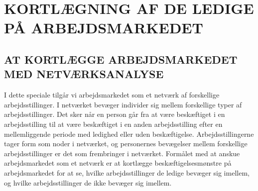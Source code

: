 



\chapter{KORTLÆGNING AF DE LEDIGE PÅ ARBEJDSMARKEDET} \label{metode}













\section{AT KORTLÆGGE ARBEJDSMARKEDET MED NETVÆRKSANALYSE \label{netvaerksanalyse}}

I dette speciale tilgår vi arbejdsmarkedet som et netværk af forskellige arbejdsstillinger. I netværket bevæger individer sig mellem forskellige typer af arbejdsstillinger. Det sker når en person går fra at være beskæftiget i en arbejdsstilling til at være beskæftiget i en anden arbejdsstilling efter en mellemliggende periode med ledighed eller uden beskæftigelse. Arbejdsstillingerne tager form som noder i netværket, og personernes bevægelser mellem forskellige arbejdsstillinger er det som frembringer  i netværket. Formålet med at anskue arbejdsmarkedet som et netværk er at kortlægge beskæftigelsesmønstre på arbejdsmarkedet for at se, hvilke arbejdsstillinger de ledige bevæger sig imellem, og hvilke arbejdsstillinger de ikke bevæger sig imellem.


